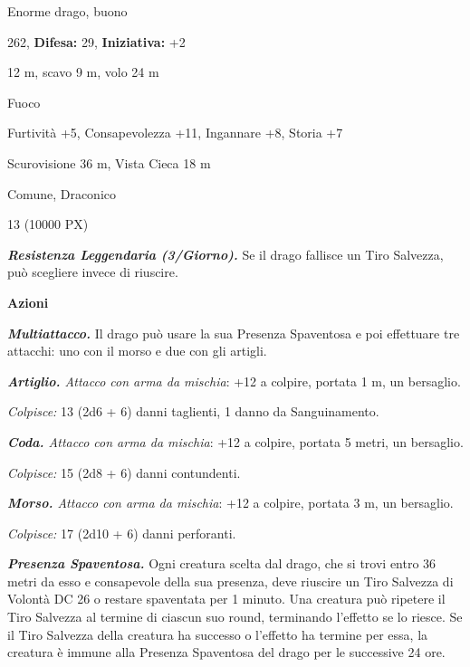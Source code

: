 \begin{multicols}{2}
{
\begin{description}[noitemsep, topsep=0pt, parsep=0pt, partopsep=0pt, leftmargin=0cm, labelwidth=2.2cm]
	\item[\textbf{Taglia/Tipo:}] Enorme drago, buono
	\item[\textbf{Caratt.:}] 
	\item[\textbf{Punti Ferita:}] 262,  \textbf{Difesa:} 29,  \textbf{Iniziativa:} +2
	\item[\textbf{Movimento:}] 12 m, scavo 9 m, volo 24 m
	\item[\textbf{Tiri Salvez.:}] 
	\item[\textbf{Imm. Danni:}] Fuoco
	\item[\textbf{Comp.:}] Furtività +5, Consapevolezza +11, Ingannare +8, Storia +7
	\item[\textbf{Sensi:}] Scurovisione 36 m, Vista Cieca 18 m
	\item[\textbf{Linguaggi:}] Comune, Draconico
	\item[\textbf{Sfida:}] 13 (10000 PX)\smallskip
\end{description}

\emph{\textbf{Resistenza Leggendaria (3/Giorno).}} Se il drago fallisce un Tiro Salvezza, può scegliere invece di riuscire.

\textbf{Azioni}

\emph{\textbf{Multiattacco.}} Il drago può usare la sua Presenza Spaventosa e poi effettuare tre attacchi: uno con il morso e due con gli artigli.

\emph{\textbf{Artiglio.} Attacco con arma da mischia}: +12 a colpire, portata 1 m, un bersaglio.

\emph{Colpisce:} 13 (2d6 + 6) danni taglienti, 1 danno da Sanguinamento.

\emph{\textbf{Coda.} Attacco con arma da mischia}: +12 a colpire, portata 5 metri, un bersaglio.

\emph{Colpisce:} 15 (2d8 + 6) danni contundenti.

\emph{\textbf{Morso.} Attacco con arma da mischia}: +12 a colpire, portata 3 m, un bersaglio.

\emph{Colpisce:} 17 (2d10 + 6) danni perforanti.

\emph{\textbf{Presenza Spaventosa.}} Ogni creatura scelta dal drago, che si trovi entro 36 metri da esso e consapevole della sua presenza, deve riuscire un Tiro Salvezza di Volontà DC 26 o restare spaventata per 1 minuto. Una creatura può ripetere il Tiro Salvezza al termine di ciascun suo round, terminando l'effetto se lo riesce. Se il Tiro Salvezza della creatura ha successo o l'effetto ha termine per essa, la creatura è immune alla Presenza Spaventosa del drago per le successive 24 ore.

}
\end{multicols}
